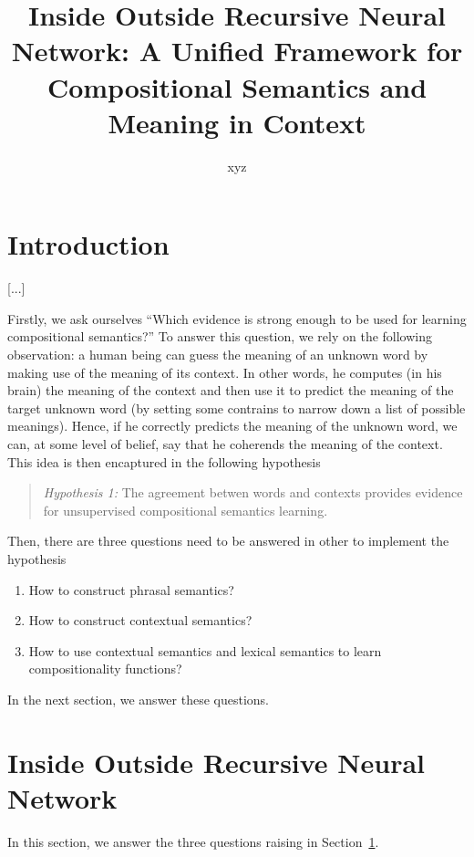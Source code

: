 \documentclass[11pt]{article}
\title{Inside Outside Recursive Neural Network: A Unified Framework for 
Compositional Semantics and Meaning in Context}
\author{xyz}
\begin{document}
\maketitle


\section{Introduction}
\label{section introduction}

[...]

Firstly, we ask ourselves ``Which evidence is strong enough to be used for 
learning compositional semantics?'' To answer this question, we rely on the 
following observation: a human being can guess the meaning of an unknown 
word by making use of the meaning of its context. In other words, he computes 
(in his brain) the meaning of the context and then use it to predict the meaning 
of the target unknown word (by setting some contrains to narrow down a list of 
possible meanings). Hence, if he correctly predicts the meaning of the unknown word, 
we can, at some level of belief, say that he coherends the meaning of the context. 
This idea is then encaptured in the following hypothesis
\begin{quote}
\textit{Hypothesis 1:} The agreement betwen words and contexts provides evidence for unsupervised 
compositional semantics learning. 
\end{quote}

Then, there are three questions need to be answered in other to implement the 
hypothesis
\begin{enumerate}
	\item How to construct phrasal semantics?
	\item How to construct contextual semantics?
	\item How to use contextual semantics and lexical semantics to learn 
	compositionality functions?
\end{enumerate}
In the next section, we answer these questions.


\section{Inside Outside Recursive Neural Network}
\label{section iornn}

In this section, we answer the three questions raising in Section~\ref{section introduction}.
\end{document}
